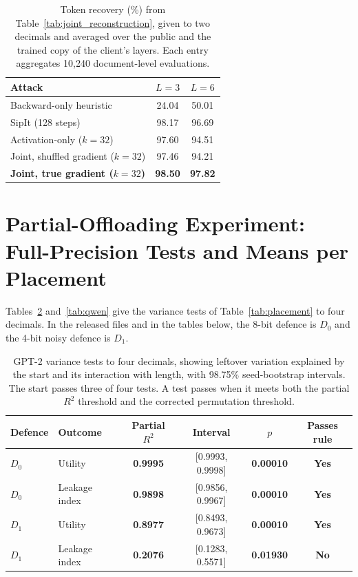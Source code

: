 \documentclass[11pt]{article}
\newcommand{\keyresult}[1]{\textbf{\textcolor{resultcol}{#1}}}
\newcommand{\passresult}[1]{\textbf{\textcolor{passcol}{#1}}}
\newcommand{\failresult}[1]{\textbf{\textcolor{failcol}{#1}}}
\begin{document}
\begin{table}[H]
\centering
\begin{tabular}{lcc}
\toprule
\textbf{Attack} & \textbf{$L=3$} & \textbf{$L=6$} \\
\midrule
Backward-only heuristic & 24.04 & 50.01 \\
SipIt (128 steps) & 98.17 & 96.69 \\
Activation-only ($k{=}32$) & 97.60 & 94.51 \\
Joint, shuffled gradient ($k{=}32$) & 97.46 & 94.21 \\
\textbf{Joint, true gradient ($k{=}32$)} & \keyresult{98.50} & \keyresult{97.82} \\
\bottomrule
\end{tabular}
\caption{Token recovery (\%) from Table~\ref{tab:joint_reconstruction}, given to two decimals and averaged over the public and the trained copy of the client's layers. Each entry aggregates 10{,}240 document-level evaluations.}
\label{tab:joint_reconstruction_full}
\end{table}

\clearpage
\section{Partial-Offloading Experiment: Full-Precision Tests and Means per Placement}
\label{app:p6}
Tables~\ref{tab:p6} and~\ref{tab:qwen} give the variance tests of Table~\ref{tab:placement} to four decimals. In the released files and in the tables below, the 8-bit defence is $D_0$ and the 4-bit noisy defence is $D_1$.

\begin{table}[H]
\centering\small
\begin{tabular}{llcccc}
\toprule
Defence & Outcome & Partial $R^2$ & Interval & $p$ & Passes rule \\
\midrule
$D_0$ & Utility & \keyresult{0.9995} & [0.9993, 0.9998] & \passresult{0.00010} & \passresult{Yes} \\
$D_0$ & Leakage index & \keyresult{0.9898} & [0.9856, 0.9967] & \passresult{0.00010} & \passresult{Yes} \\
$D_1$ & Utility & \keyresult{0.8977} & [0.8493, 0.9673] & \passresult{0.00010} & \passresult{Yes} \\
$D_1$ & Leakage index & \failresult{0.2076} & [0.1283, 0.5571] & \failresult{0.01930} & \failresult{No} \\
\bottomrule
\end{tabular}
\caption{GPT-2 variance tests to four decimals, showing leftover variation explained by the start and its interaction with length, with 98.75\% seed-bootstrap intervals. The start passes three of four tests. A test passes when it meets both the partial $R^2$ threshold and the corrected permutation threshold.}
\label{tab:p6}
\end{table}
\end{document}
